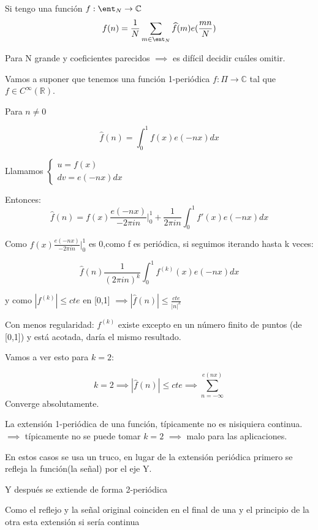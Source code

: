 	Si tengo una función $f: \ent_N \rightarrow \mathbb{C}$
	$$f(n) = \frac{1}{N}\sum_{m \in \ent_N}\widehat{f}(m)e(\frac{mn}{N})$$
	
	Para N grande y coeficientes parecidos $\implies$ es difícil decidir cuáles omitir.
	
	Vamos a suponer que tenemos una función 1-periódica $f : \Pi \rightarrow \mathbb{C}$ tal que $f \in C^{\infty}(\mathbb{R})$.
	
	Para $n \neq 0$
	
	$$\widehat{f}(n) = \int_{0}^{1} f(x) e(-nx) dx$$
	
	Llamamos $\begin{cases}
	u = f(x)\\
	dv = e(-nx) dx
	\end{cases}$
	
	Entonces:
	$$\widehat{f}(n) = f(x) \frac{e(-nx)}{-2\pi in}|_{0}^1 + \frac{1}{2\pi i n} \int_{0}^1 f'(x) e(-nx) dx$$
	
	Como $f(x) \frac{e(-nx)}{-2\pi in}|_{0}^1 $ es 0,como f es periódica, si seguimos iterando hasta k veces:
	
	$$\widehat{f}(n)  \frac{1}{(2\pi i n)^k} \int_{0}^1 f^{(k)}(x) e(-nx) dx$$
	
	y como $|f^{(k)}| \leq cte$ en [0,1] $\implies |\widehat{f}(n)| \leq \frac{cte}{|n|^k}$
	
	Con menos regularidad: $f^{(k)}$ existe excepto en un número finito de puntos (de [0,1]) y está acotada, daría el mismo resultado.
	
	Vamos a ver esto para $k=2$:
	
	$$k=2 \implies |\widehat{f}(n)| \leq cte \implies \sum_{n= -\infty}^{e(nx)}$$
	Converge absolutamente.
	

\begin{center}
	\centering
\end{center}
	
	La extensión 1-periódica de una función, típicamente no es nisiquiera continua. $\implies$ típicamente no se puede tomar $k=2$ $\implies$ malo para las aplicaciones.
	
	En estos casos se usa un truco, en lugar de la extensión periódica primero se refleja la función(la señal) por el eje Y.
	
	Y después se extiende de forma 2-periódica
	
	Como el reflejo y la señal original coinciden en el final de una y el principio de la otra esta extensión si sería continua
	
